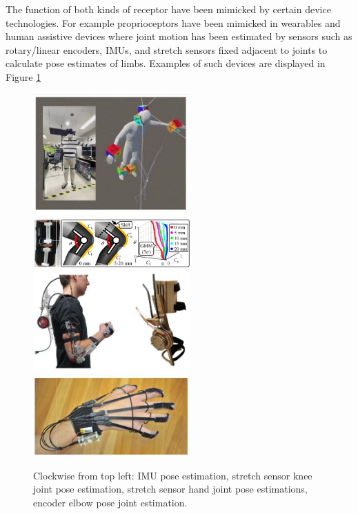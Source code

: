 The function of both kinds of receptor have been mimicked by certain device technologies. For example proprioceptors have been mimicked in wearables and human assistive devices where joint motion has been estimated by sensors such as rotary/linear encoders, IMUs, and stretch sensors fixed adjacent to joints to calculate pose estimates of limbs\cite{OBrien2014,Eguchi2020,Chatfield2021,Kim2022}. Examples of such devices are displayed in Figure \ref{fig:proprio-tech}
\begin{figure}[H]
    \centering
    \includegraphics[width=6cm]{Figures/imu-pose-tracker-kim2022.jpg}
    \includegraphics[width=6cm]{Figures/knee-stretch-sense-eguchi2020.jpg}
    \includegraphics[width=6cm]{Figures/logan-assitive-arm-device.jpg}
    \includegraphics[width=6cm]{Figures/stretch-sense-OBrien2014.jpg}
    \caption{Clockwise from top left: IMU pose estimation\cite{Kim2022}, stretch sensor knee joint pose estimation\cite{Eguchi2020}, stretch sensor hand joint pose estimations\cite{OBrien2014}, encoder elbow pose joint estimation\cite{Chatfield2021}.}
    \label{fig:proprio-tech}
\end{figure}
